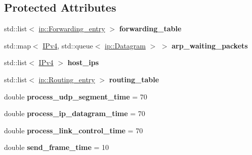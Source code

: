 \subsection*{Protected Attributes}
\begin{DoxyCompactItemize}
\item 
std\+::list$<$ \hyperlink{structip_1_1Forwarding__entry}{ip\+::\+Forwarding\+\_\+entry} $>$ {\bfseries forwarding\+\_\+table}\hypertarget{classip__protocol_aaeb5d99cd92641500f0013e3822d56a1}{}\label{classip__protocol_aaeb5d99cd92641500f0013e3822d56a1}

\item 
std\+::map$<$ \hyperlink{structIPv4}{I\+Pv4}, std\+::queue$<$ \hyperlink{structip_1_1Datagram}{ip\+::\+Datagram} $>$ $>$ {\bfseries arp\+\_\+waiting\+\_\+packets}\hypertarget{classip__protocol_a284258e9e9050ae7e51b3864f5a953ce}{}\label{classip__protocol_a284258e9e9050ae7e51b3864f5a953ce}

\item 
std\+::list$<$ \hyperlink{structIPv4}{I\+Pv4} $>$ {\bfseries host\+\_\+ips}\hypertarget{classip__protocol_aa7d9cb9aba71a12d55cbb48ebb8023bf}{}\label{classip__protocol_aa7d9cb9aba71a12d55cbb48ebb8023bf}

\item 
std\+::list$<$ \hyperlink{structip_1_1Routing__entry}{ip\+::\+Routing\+\_\+entry} $>$ {\bfseries routing\+\_\+table}\hypertarget{classip__protocol_a10115583b02359dd2a5670d1ad15f491}{}\label{classip__protocol_a10115583b02359dd2a5670d1ad15f491}

\item 
double {\bfseries process\+\_\+udp\+\_\+segment\+\_\+time} = 70\hypertarget{classip__protocol_a70dbab92c8f81ef06fd54f3e8d7bd948}{}\label{classip__protocol_a70dbab92c8f81ef06fd54f3e8d7bd948}

\item 
double {\bfseries process\+\_\+ip\+\_\+datagram\+\_\+time} = 70\hypertarget{classip__protocol_a5a4799b4959601058134ada5e68535d9}{}\label{classip__protocol_a5a4799b4959601058134ada5e68535d9}

\item 
double {\bfseries process\+\_\+link\+\_\+control\+\_\+time} = 70\hypertarget{classip__protocol_a5d8f0b585621473601c220ad283a825f}{}\label{classip__protocol_a5d8f0b585621473601c220ad283a825f}

\item 
double {\bfseries send\+\_\+frame\+\_\+time} = 10\hypertarget{classip__protocol_a228a55f7b2c25fa8e3900893ccc87e41}{}\label{classip__protocol_a228a55f7b2c25fa8e3900893ccc87e41}

\end{DoxyCompactItemize}



